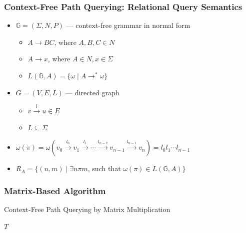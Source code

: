 \documentclass[xcolor=table]{beamer}
\begin{document}
  \begin{frame}[fragile]
    \frametitle{Context-Free Path Querying: Relational Query Semantics}
    \begin{itemize}
      \item $\mathbb{G} = (\Sigma, N, P)$ --- context-free grammar in normal form
      \begin{itemize}
        \item $A \rightarrow B C$, where $A, B, C \in N$
        \item $A \rightarrow x$, where $A \in N, x \in \Sigma$
        \item $L(\mathbb{G},A) = \{ \omega \mid A \rightarrow^* \omega \}$
      \end{itemize}
      \item $G = (V,E,L)$ --- directed graph
        \begin{itemize}
          \item $v \xrightarrow{l} u \in E$
          \item $L \subseteq \Sigma$
        \end{itemize}
      \item $\omega(\pi) = \omega(v_0 \xrightarrow{l_0} v_1 \xrightarrow{l_1} \cdots \xrightarrow{l_{n-2}} v_{n-1} \xrightarrow{l_{n-1}} v_n) = l_0 l_1 \cdots l_{n-1}$
      \item $R_A = \{ (n, m) \mid \exists n \pi m$, such that $\omega(\pi) \in L(\mathbb{G},A)\}$
    \end{itemize}
  \end{frame}

  \begin{frame}[fragile] \frametitle{Matrix-Based Algorithm}
    \begin{algorithm}[H]
    \begin{algorithmic}[1]
    \caption{Context-Free Path Querying by Matrix Multiplication}

        \EndFor
        \EndWhile
    \State \Return $T$
    \EndFunction
    \end{algorithmic}
    \end{algorithm}
  \end{frame}
\end{document}
